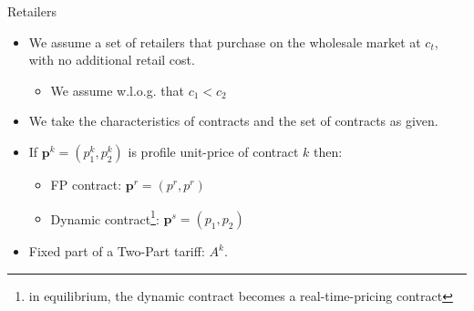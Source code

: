 \documentclass{class}
\begin{document}

\begin{frame}{Retailers}

\begin{itemize}
    \item We assume a set of retailers that purchase on the wholesale market at  $c_t$, with no additional retail cost. \vfill
    \begin{itemize}
        \item We assume w.l.o.g. that $c_1 < c_2$ 
    \end{itemize}
    

    \vfill

    \item We take the characteristics of contracts and the set of contracts as given.  \vfill
    
    \item If $\textbf{p}^k=(p_1^k,p_2^k)$ is profile unit-price of contract $k$ then:  \vfill

    \begin{itemize}
        \item FP contract: $\textbf{p}^{r} =  (p^r,p^r)$  \vfill
        \item Dynamic contract\footnote{in equilibrium, the dynamic contract becomes a real-time-pricing contract}: $\textbf{p}^{s} =  (p_1,p_2)$  
    \end{itemize}

\vfill

\item Fixed part of a Two-Part tariff: $A^k$.

\end{itemize}


    
\end{frame}

\end{document}
